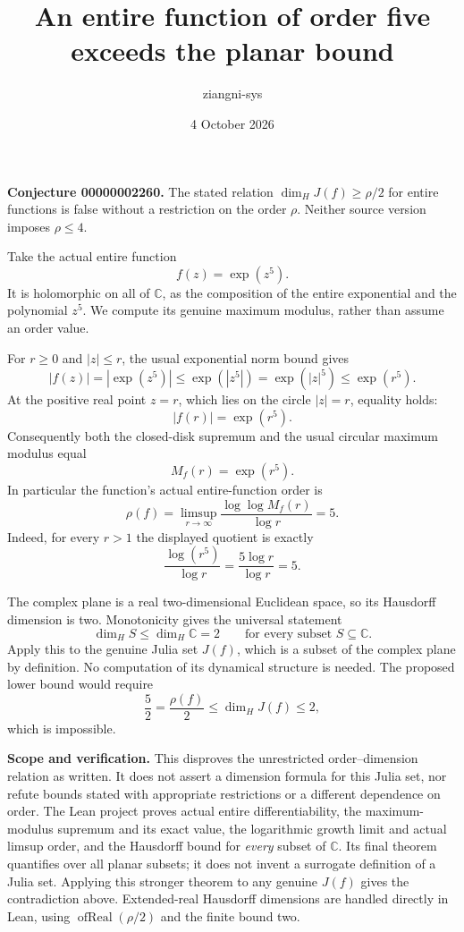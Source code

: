\documentclass[11pt]{article}
\title{An entire function of order five exceeds the planar bound}
\author{ziangni-sys}
\date{4 October 2026}
\begin{document}
\maketitle
\noindent\textbf{Conjecture 00000002260.} The stated relation $\dim_H J(f)\geq\rho/2$ for entire functions is false without a restriction on the order $\rho$. Neither source version imposes $\rho\leq4$.

Take the actual entire function
\[
 f(z)=\exp(z^5).
\]
It is holomorphic on all of $\mathbb C$, as the composition of the entire exponential and the polynomial $z^5$. We compute its genuine maximum modulus, rather than assume an order value.

For $r\geq0$ and $|z|\leq r$, the usual exponential norm bound gives
\[
 |f(z)|=|\exp(z^5)|\leq\exp(|z^5|)
 =\exp(|z|^5)\leq\exp(r^5).
\]
At the positive real point $z=r$, which lies on the circle $|z|=r$, equality holds:
\[
 |f(r)|=\exp(r^5).
\]
Consequently both the closed-disk supremum and the usual circular maximum modulus equal
\[
 M_f(r)=\exp(r^5).
\]
In particular the function's actual entire-function order is
\[
 \rho(f)=\limsup_{r\to\infty}\frac{\log\log M_f(r)}{\log r}=5.
\]
Indeed, for every $r>1$ the displayed quotient is exactly
\[
 \frac{\log(r^5)}{\log r}=\frac{5\log r}{\log r}=5.
\]

The complex plane is a real two-dimensional Euclidean space, so its Hausdorff dimension is two. Monotonicity gives the universal statement
\[
 \dim_H S\leq\dim_H\mathbb C=2
 \qquad\text{for every subset }S\subseteq\mathbb C.
\]
Apply this to the genuine Julia set $J(f)$, which is a subset of the complex plane by definition. No computation of its dynamical structure is needed. The proposed lower bound would require
\[
 \frac52=\frac{\rho(f)}2\leq\dim_H J(f)\leq2,
\]
which is impossible.

\noindent\textbf{Scope and verification.} This disproves the unrestricted order--dimension relation as written. It does not assert a dimension formula for this Julia set, nor refute bounds stated with appropriate restrictions or a different dependence on order. The Lean project proves actual entire differentiability, the maximum-modulus supremum and its exact value, the logarithmic growth limit and actual limsup order, and the Hausdorff bound for \emph{every} subset of $\mathbb C$. Its final theorem quantifies over all planar subsets; it does not invent a surrogate definition of a Julia set. Applying this stronger theorem to any genuine $J(f)$ gives the contradiction above. Extended-real Hausdorff dimensions are handled directly in Lean, using $\operatorname{ofReal}(\rho/2)$ and the finite bound two.
\end{document}
